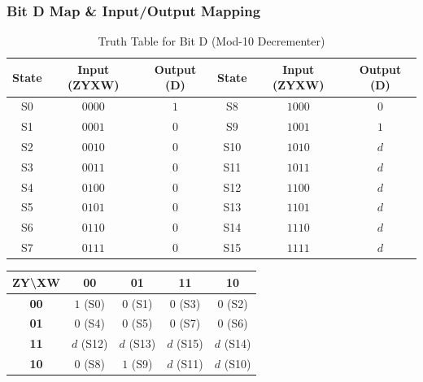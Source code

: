 \documentclass[journal,12pt,onecolumn]{IEEEtran}
\begin{document}
		\vspace{1em}
		\subsubsection{Bit D Map \& Input/Output Mapping}
		
		\begin{table}[H]
			\centering
			\begin{tabular}{|c|c|c||c|c|c|}
				\hline
				\textbf{State} & \textbf{Input (ZYXW)} & \textbf{Output (D)} & \textbf{State} & \textbf{Input (ZYXW)} & \textbf{Output (D)} \\
				\hline
				S0 & $0000$ & $1$ & S8 & $1000$ & $0$ \\
				\hline
				S1 & $0001$ & $0$ & S9 & $1001$ & $1$ \\
				\hline
				S2 & $0010$ & $0$ & S10 & $1010$ & $d$ \\
				\hline
				S3 & $0011$ & $0$ & S11 & $1011$ & $d$ \\
				\hline
				S4 & $0100$ & $0$ & S12 & $1100$ & $d$ \\
				\hline
				S5 & $0101$ & $0$ & S13 & $1101$ & $d$ \\
				\hline
				S6 & $0110$ & $0$ & S14 & $1110$ & $d$ \\
				\hline
				S7 & $0111$ & $0$ & S15 & $1111$ & $d$ \\
				\hline
			\end{tabular}
			\caption{Truth Table for Bit D (Mod-10 Decrementer)}
		\end{table}
		
		\begin{table}[H]
			\centering
			\begin{tabular}{|c|c|c|c|c|}
				\hline
				\textbf{ZY\textbackslash XW} & \textbf{00} & \textbf{01} & \textbf{11} & \textbf{10} \\
				\hline
				\textbf{00} & \cellcolor{grpRed}$1$ (S0) & $0$ (S1) & $0$ (S3) & $0$ (S2) \\
				\hline
				\textbf{01} & $0$ (S4) & $0$ (S5) & $0$ (S7) & $0$ (S6) \\
				\hline
				\textbf{11} & \cellcolor{grpRed}$d$ (S12) & $d$ (S13) & $d$ (S15) & \cellcolor{grpRed}$d$ (S14) \\
				\hline
				\textbf{10} & $0$ (S8) & \cellcolor{grpGreen}$1$ (S9) & $d$ (S11) & \cellcolor{grpRed}$d$ (S10) \\
				\hline
			\end{tabular}
		\end{table}
		
\end{document}
